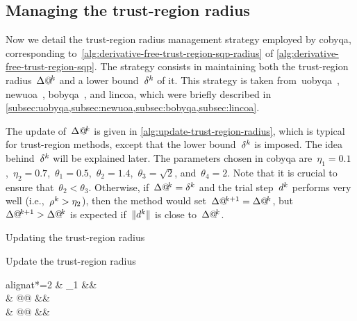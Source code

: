 \subsection{Managing the trust-region radius}
\label{subsec:managing-trust-region-radius}

Now we detail the trust-region radius management strategy employed by \gls{cobyqa}, corresponding to~\cref{alg:derivative-free-trust-region-sqp-radius} of \cref{alg:derivative-free-trust-region-sqp}. The strategy consists in maintaining both the trust-region radius~$\rad[k]$ and a lower bound~$\radlb[k]$ of it. This strategy is taken from~\gls{uobyqa}~\cite{Powell_2002}, \gls{newuoa}~\cite{Powell_2006}, \gls{bobyqa}~\cite{Powell_2009}, and \gls{lincoa}, which were briefly described in \cref{subsec:uobyqa,subsec:newuoa,subsec:bobyqa,subsec:lincoa}.

The update of~$\rad[k]$ is given in \cref{alg:update-trust-region-radius}, which is typical for trust-region methods, except that the lower bound~$\radlb[k]$ is imposed.
The idea behind~$\radlb[k]$ will be explained later.
The parameters chosen in \gls{cobyqa} are~$\eta_1 = 0.1$,~$\eta_2 = 0.7$,~$\theta_1 = 0.5$,~$\theta_2 = 1.4$,~$\theta_3 = \sqrt{2}$, and~$\theta_4 = 2$.
Note that it is crucial to ensure that~$\theta_2 < \theta_3$.
Otherwise, if~$\rad[k] = \radlb[k]$ and the trial step~$\step[k]$ performs very well (i.e.,~$\ratio[k] > \eta_2$), then the method would set~$\rad[k + 1] = \rad[k]$, but~$\rad[k + 1] > \rad[k]$ is expected if~$\norm{\step[k]}$ is close to~$\rad[k]$.

\begin{algorithm}
    \caption{Updating the trust-region radius}
    \label{alg:update-trust-region-radius}
    \DontPrintSemicolon
    \onehalfspacing
    Update the trust-region radius
    \begin{algoempheq}[left={\rad[k + 1] \gets \empheqlbrace}]{alignat*=2}
        & \theta_1 \rad[k]                                                                      && \quad {}\\
        & \max @@ \set{\theta_1 \rad[k], \norm{\step[k]}}                                          && \quad {}\\
        & \min @@     && \quad {}
    \end{algoempheq}
    \If{$\rad[k + 1] \le \theta_2 \radlb[k]$}{
        $\rad[k + 1] \gets \radlb[k]$\;
    }
\end{algorithm}

